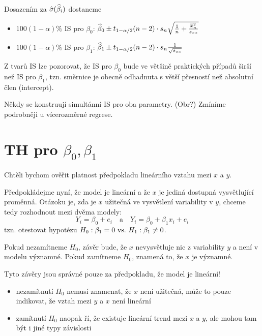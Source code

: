 Dosazením za $\hat{\sigma}(\widehat{\beta}_i)$ dostaneme

\begin{itemize}
	\item $100(1-\alpha)\%$ IS pro $\beta_0$: $\widehat{\beta}_0 \pm t_{1-\alpha/2}(n-2) \cdot s_n \sqrt{\frac{1}{n} + \frac{\overline{x}_n^2}{s_{xx}}}$
	\item $100(1-\alpha)\%$ IS pro $\beta_1$: $\widehat{\beta}_1 \pm t_{1-\alpha/2}(n-2) \cdot s_n \frac{1}{\sqrt{s_{xx}}}$
\end{itemize}

\begin{remark}
	Z tvarů IS lze pozorovat, že IS pro $\beta_0$ bude ve většině praktických případů širší než IS pro $\beta_1$, tzn. směrnice je obecně odhadnuta s větší přesností než absolutní člen (intercept).
\end{remark}


\begin{remark}
	Někdy se konstruují simultánní IS pro oba parametry. (Obr?) Zmíníme podrobněji u vícerozměrné regrese.
\end{remark}


\section{TH pro $\beta_0, \beta_1$}

Chtěli bychom ověřit platnost předpokladu lineárního vztahu mezi $x$ a $y$.

Předpokládejme nyní, že model je lineární a že $x$ je jediná dostupná vysvětlující proměnná. Otázoku je, zda je $x$ užitečná ve vysvětlení variability v $y$, chceme tedy rozhodnout mezi dvěma modely:
$$
	Y_i = \beta_0 + e_i \quad \text{a} \quad Y_i = \beta_0 + \beta_1 x_i + e_i
$$
tzn. otestovat hypotézu $H_0: \beta_1 = 0 ~\text{vs.}~ H_1: \beta_1 \neq 0$.

Pokud nezamítneme $H_0$, závěr bude, že $x$ nevysvětluje nic z variability $y$ a není v modelu významné. Pokud zamítneme $H_0$, znamená to, že $x$ je významné.

\begin{remark}
	Tyto závěry jsou správné pouze za předpokladu, že model je lineární!
	\begin{itemize}
		\item nezamítnutí $H_0$ nemusí znamenat, že $x$ není užitečná, může to pouze indikovat, že vztah mezi $y$ a $x$ není lineární
		\item zamítnutí $H_0$ naopak ří, že existuje lineární trend mezi $x$ a $y$, ale mohou tam být i jiné typy závislosti
	\end{itemize}
\end{remark}

